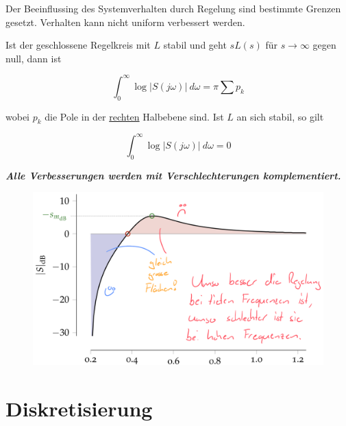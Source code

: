 \documentclass[
  10pt,
  a4paper,
  twocolumn]{article}
\numberwithin{equation}{section}
\begin{document}
Der Beeinflussing des Systemverhalten durch Regelung sind bestimmte
Grenzen gesetzt. Verhalten kann nicht uniform verbessert werden.

\begin{tcolorbox}[enhanced jigsaw, opacitybacktitle=0.6, bottomrule=.15mm, left=2mm, colframe=quarto-callout-note-color-frame, titlerule=0mm, toprule=.15mm, bottomtitle=1mm, toptitle=1mm, coltitle=black, title=\textcolor{quarto-callout-note-color}{\faInfo}\hspace{0.5em}{Bode's Integral}, arc=.35mm, rightrule=.15mm, colback=white, opacityback=0, leftrule=.75mm, colbacktitle=quarto-callout-note-color!10!white, breakable]

Ist der geschlossene Regelkreis mit \(L\) stabil und geht \(sL(s)\) für
\(s\rightarrow\infty\) gegen null, dann ist

\[
\int_0^\infty \log\lvert S(j\omega)\rvert\ d\omega = \pi \sum p_k
\]

wobei \(p_k\) die Pole in der \ul{rechten} Halbebene sind. Ist \(L\) an
sich stabil, so gilt

\[
\int_0^\infty\log\lvert S(j\omega)\rvert\ d\omega = 0
\]

\textbf{\emph{Alle Verbesserungen werden mit Verschlechterungen
komplementiert.}}

\begin{figure}[H]

{\centering \includegraphics{images/paste-81.png}

}

\end{figure}

\end{tcolorbox}

\hypertarget{diskretisierung}{%
\section{Diskretisierung}\label{diskretisierung}}
\end{document}
